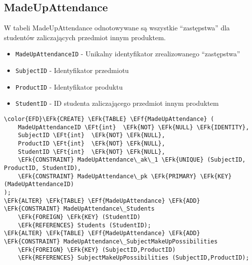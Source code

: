 \documentclass[11pt]{article}
\newcommand{\EFk}[1]{\textcolor{EFk}{\textbf{#1}}} %
\newcommand{\EFf}[1]{\textcolor{EFf}{#1}} %
\newcommand{\EFt}[1]{\textcolor{EFt}{\textbf{#1}}} %
\begin{document}
\subsection{MadeUpAttendance}
\label{sec:orgfef5c65}
W tabeli MadeUpAttendance odnotowywane są wszystkie ``zastępstwa'' dla studentów zaliczających przedmiot innym produktem.
\begin{itemize}
\item \texttt{MadeUpAttendanceID} - Unikalny identyfikator zrealizowanego ``zastępstwa''
\item \texttt{SubjectID} - Identyfikator przedmiotu
\item \texttt{ProductID} - Identyfikator produktu
\item \texttt{StudentID} - ID studenta zaliczającego przedmiot innym produktem
\end{itemize}
\begin{Code}
\begin{Verbatim}
\color{EFD}\EFk{CREATE} \EFk{TABLE} \EFf{MadeUpAttendance} (
    MadeUpAttendanceID \EFt{int}  \EFk{NOT} \EFk{NULL} \EFk{IDENTITY},
    SubjectID \EFt{int}  \EFk{NOT} \EFk{NULL},
    ProductID \EFt{int}  \EFk{NOT} \EFk{NULL},
    StudentID \EFt{int}  \EFk{NOT} \EFk{NULL},
    \EFk{CONSTRAINT} MadeUpAttendance\_ak\_1 \EFk{UNIQUE} (SubjectID, ProductID, StudentID),
    \EFk{CONSTRAINT} MadeUpAttendance\_pk \EFk{PRIMARY} \EFk{KEY}  (MadeUpAttendanceID)
);
\EFk{ALTER} \EFk{TABLE} \EFf{MadeUpAttendance} \EFk{ADD} \EFk{CONSTRAINT} MadeUpAttendance\_Students
    \EFk{FOREIGN} \EFk{KEY} (StudentID)
    \EFk{REFERENCES} Students (StudentID);
\EFk{ALTER} \EFk{TABLE} \EFf{MadeUpAttendance} \EFk{ADD} \EFk{CONSTRAINT} MadeUpAttendance\_SubjectMakeUpPossibilities
    \EFk{FOREIGN} \EFk{KEY} (SubjectID,ProductID)
    \EFk{REFERENCES} SubjectMakeUpPossibilities (SubjectID,ProductID);
\end{Verbatim}
\end{Code}
\end{document}
